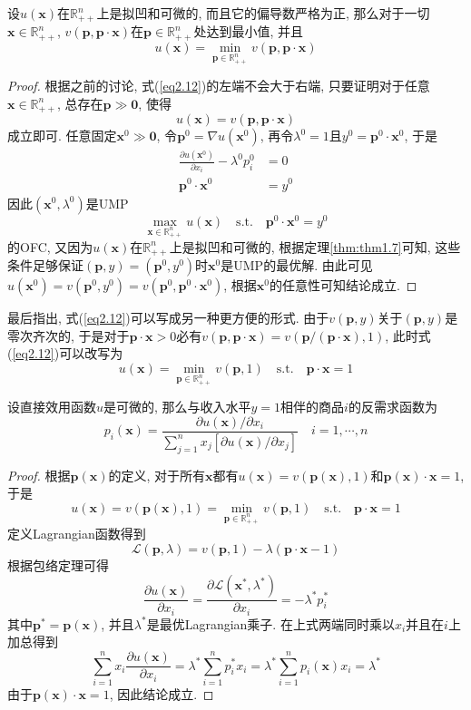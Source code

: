 \documentclass[cn, 12pt, math=mtpro2, bibstyle=apa, blue]{elegantbook}
\newcommand{\R}{\mathbb{R}}
\newcommand{\p}{\mathbf{p}}
\newcommand{\x}{\mathbf{x}}
\begin{document}
\begin{theorem}
  设$u(\x)$在$\R_{++}^n$上是拟凹和可微的, 而且它的偏导数严格为正, 那么对于一切$\x\in\R_{++}^n$, $v(\p,\p\cdot\x)$在$\p\in\R_{++}^n$处达到最小值, 并且
  \begin{equation}\label{eq2.12}
    u(\x)=\min_{\p\in\R_{++}^n}v(\p,\p\cdot\x)
  \end{equation}
\end{theorem}
\begin{proof}
  根据之前的讨论, 式(\ref{eq2.12})的左端不会大于右端, 只要证明对于任意$\x\in\R_{++}^n$, 总存在$\p\gg\mathbf{0}$, 使得
  \begin{equation}\label{eq2.13}
    u(\x)=v(\p,\p\cdot\x)
  \end{equation}
  成立即可. 任意固定$\x^0\gg\mathbf{0}$, 令$\p^0=\nabla u(\x^0)$, 再令$\lambda^0=1$且$y^0=\p^0\cdot\x^0$, 于是
  \begin{align*}
  \frac{\partial u(\x^0)}{\partial x_i}-\lambda^0p_i^0&=0 \\
  \p^0\cdot\x^0&=y^0
  \end{align*}
  因此$(\x^0,\lambda^0)$是UMP
  $$\max_{\x\in\R_{++}^n}u(\x)\quad\text{s.t.}\quad\p^0\cdot\x^0=y^0$$
  的OFC, 又因为$u(\x)$在$\R_{++}^n$上是拟凹和可微的, 根据定理\ref{thm:thm1.7}可知, 这些条件足够保证$(\p,y)=(\p^0,y^0)$时$\x^0$是UMP的最优解. 由此可见$u(\x^0)=v(\p^0,y^0)=v(\p^0,\p^0\cdot\x^0)$, 根据$\x^0$的任意性可知结论成立.
\end{proof}

最后指出, 式(\ref{eq2.12})可以写成另一种更方便的形式. 由于$v(\p,y)$关于$(\p,y)$是零次齐次的, 于是对于$\p\cdot\x>0$必有$v(\p,\p\cdot\x)=v(\p/(\p\cdot\x),1)$, 此时式(\ref{eq2.12})可以改写为
\begin{equation}\label{eq2.14}
  u(\x)=\min_{\p\in\R_{++}^n}v(\p,1)\quad\text{s.t.}\quad\p\cdot\x=1
\end{equation}
\begin{theorem}
  设直接效用函数$u$是可微的, 那么与收入水平$y=1$相伴的商品$i$的反需求函数为
  $$p_i(\x)=\frac{\partial u(\x)/\partial x_i}{\sum_{j=1}^{n}x_j[\partial u(\x)/\partial x_j]}\quad i=1,\cdots,n$$
\end{theorem}
\begin{proof}
  根据$\p(\x)$的定义, 对于所有$\x$都有$u(\x)=v(\p(\x),1)$和$\p(\x)\cdot\x=1$, 于是
  \begin{equation}\label{eq2.15}
    u(\x)=v(\p(\x),1)=\min_{\p\in\R_{++}^n}v(\p,1)\quad\text{s.t.}\quad\p\cdot\x=1
  \end{equation}
  定义Lagrangian函数得到
  $$\mathcal{L}(\p,\lambda)=v(\p,1)-\lambda(\p\cdot\x-1)$$
  根据包络定理可得
  $$\frac{\partial u(\x)}{\partial x_i}=\frac{\partial\mathcal{L}(\x^\ast,\lambda^\ast)}{\partial x_i}=-\lambda^\ast p_i^\ast$$
  其中$\p^\ast=\p(\x)$, 并且$\lambda^\ast$是最优Lagrangian乘子. 在上式两端同时乘以$x_i$并且在$i$上加总得到
  $$\sum_{i=1}^{n}x_i\frac{\partial u(\x)}{\partial x_i}=\lambda^\ast\sum_{i=1}^{n}p_i^\ast x_i=\lambda^\ast\sum_{i=1}^{n}p_i(\x)x_i=\lambda^\ast$$
  由于$\p(\x)\cdot\x=1$, 因此结论成立.
\end{proof}
\end{document}
